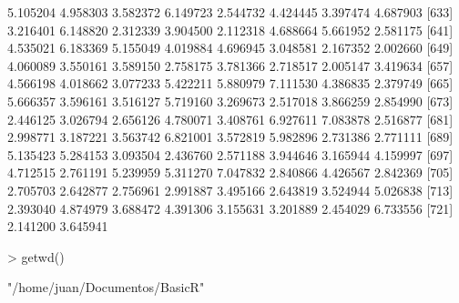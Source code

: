 \documentclass[12pt]{article}
\begin{document}
\begin{Schunk}
\begin{Soutput}
[625] 5.105204 4.958303 3.582372 6.149723 2.544732 4.424445 3.397474 4.687903
[633] 3.216401 6.148820 2.312339 3.904500 2.112318 4.688664 5.661952 2.581175
[641] 4.535021 6.183369 5.155049 4.019884 4.696945 3.048581 2.167352 2.002660
[649] 4.060089 3.550161 3.589150 2.758175 3.781366 2.718517 2.005147 3.419634
[657] 4.566198 4.018662 3.077233 5.422211 5.880979 7.111530 4.386835 2.379749
[665] 5.666357 3.596161 3.516127 5.719160 3.269673 2.517018 3.866259 2.854990
[673] 2.446125 3.026794 2.656126 4.780071 3.408761 6.927611 7.083878 2.516877
[681] 2.998771 3.187221 3.563742 6.821001 3.572819 5.982896 2.731386 2.771111
[689] 5.135423 5.284153 3.093504 2.436760 2.571188 3.944646 3.165944 4.159997
[697] 4.712515 2.761191 5.239959 5.311270 7.047832 2.840866 4.426567 2.842369
[705] 2.705703 2.642877 2.756961 2.991887 3.495166 2.643819 3.524944 5.026838
[713] 2.393040 4.874979 3.688472 4.391306 3.155631 3.201889 2.454029 6.733556
[721] 2.141200 3.645941
\end{Soutput}
\begin{Sinput}
> getwd()
\end{Sinput}
\begin{Soutput}
[1] "/home/juan/Documentos/BasicR"
\end{Soutput}
\end{Schunk}
\end{document}
